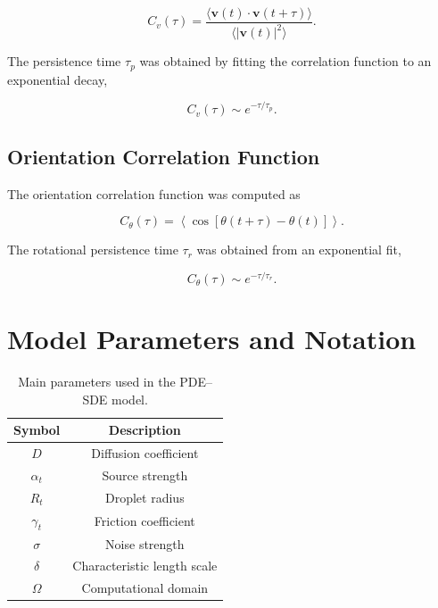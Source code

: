 \begin{equation}
C_v(\tau)
=
\frac{\langle
\mathbf{v}(t)\cdot\mathbf{v}(t+\tau)
\rangle}
{\langle |\mathbf{v}(t)|^2\rangle}.
\end{equation}

The persistence time $\tau_p$ was obtained by fitting the
correlation function to an exponential decay\cite{balakrishnan2021},

\begin{equation}
C_v(\tau)
\sim
e^{-\tau/\tau_p}.
\end{equation}
\subsection{Orientation Correlation Function}
The orientation correlation function was computed as\cite{balakrishnan2021}

\begin{equation}
C_\theta(\tau)
=
\left<
\cos[\theta(t+\tau)-\theta(t)]
\right>.
\end{equation}

The rotational persistence time $\tau_r$ was obtained from
an exponential fit\cite{balakrishnan2021},

\begin{equation}
C_\theta(\tau)
\sim
e^{-\tau/\tau_r}.
\end{equation}

\section{Model Parameters and Notation}

\begin{table}[H]
\centering
\begin{tabular}{|c|c|}
\hline
Symbol & Description \\
\hline
\(D\) & Diffusion coefficient \\
\(\alpha_t\) & Source strength \\
\(R_t\) & Droplet radius \\
\(\gamma_t\) & Friction coefficient \\
\(\sigma\) & Noise strength \\
\(\delta\) & Characteristic length scale \\
\(\Omega\) & Computational domain \\
\hline
\end{tabular}
\caption{Main parameters used in the PDE--SDE model\cite{droplet2025}.}
\end{table}

